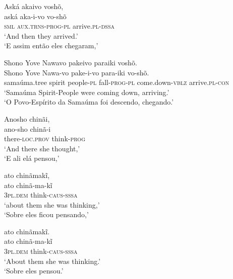 \documentclass[output=paper,
modfonts,nonflat
]{langsci/langscibook}
\begin{document}
\ea Aská akaivo voshõ, \\[.3em]
\gll aská         aka-i-vo                  vo-shõ                 \\
     \textsc{sml} \textsc{aux.trns-prog-pl} arrive.\textsc{pl-dssa} \\
\glt `And then they arrived.' \\
`E assim então eles chegaram,' \\
\z

\ea Shono Yove Nawavo pakeivo paraiki voshõ. \\[.3em]
\gll Shono        Yove   Nawa-vo            pake-i-vo             para-iki                vo-shõ.                \\
     samaúma.tree spirit people-\textsc{pl} fall-\textsc{prog-pl} come.down-\textsc{vblz} arrive.\textsc{pl-con} \\
\glt `Samaúma Spirit-People were coming down, arriving.' \\
`O Povo-Espírito da Samaúma foi descendo, chegando.' \\
\z

\newpage
\ea Anosho chinãi, \\[.3em]
\gll ano-sho                 chinã-i             \\
     there-\textsc{loc.prov} think-\textsc{prog} \\
\glt `And there she thought,' \\
`E ali elá pensou,' \\
\z

\ea ato chinãmakĩ, \\[.3em]
\gll ato              chinã-ma-kĩ              \\
     3\textsc{pl.dem} think-\textsc{caus-sssa} \\
\glt `about them she was thinking,' \\
`Sobre eles ficou pensando,' \\
\z

\ea ato chinãmakĩ. \\[.3em]
\gll ato              chinã-ma-kĩ              \\
     3\textsc{pl.dem} think-\textsc{caus-sssa} \\
\glt `About them she was thinking.'\footnotemark \\
`Sobre eles pensou.' \\
\z

\end{document}
